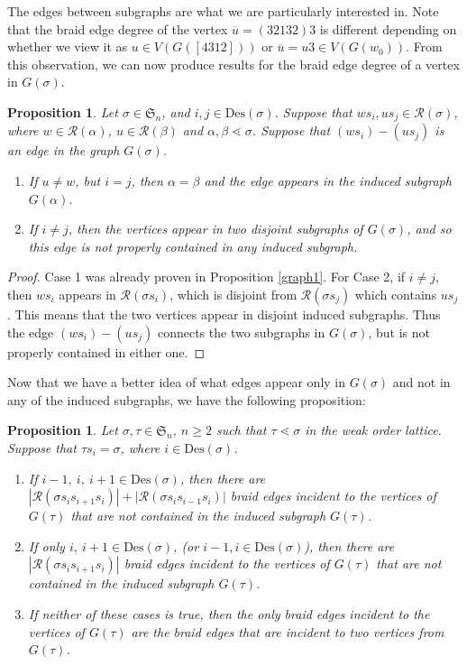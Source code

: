 \documentclass[11pt,reqno]{amsart}
\newtheorem{proposition}[theorem]{Proposition}
\theoremstyle{definition}
\theoremstyle{notation}
\newcommand{\Des}{\text{Des}}
\newcommand{\calR}{\mathcal{R}}
\begin{document}
The edges between subgraphs are what we are particularly interested in. Note that the braid edge degree of the vertex $\overline{u} = (32132)3$ is different depending on whether we view it as $u\in V(G([4312]))$ or $\overline{u} = u3\in V(G(w_0))$. From this observation, we can now produce results for the braid edge degree of a vertex in $G(\sigma)$.

\begin{proposition}\label{newEDGE}
Let $\sigma \in \mathfrak{S}_n$, and $i,j\in \Des(\sigma)$. Suppose that $ws_i, us_j \in \calR(\sigma)$, where $w\in \calR(\alpha)$, $u\in \calR(\beta)$ and $\alpha, \beta \lessdot \sigma$. Suppose that $(ws_i)- (us_j)$ is an edge in the graph $G(\sigma)$. 
\begin{enumerate}
\item If $u\neq w$, but $i=j$, then $\alpha = \beta$ and the edge appears in the induced subgraph $G(\alpha)$. 
\item If $i\neq j$, then the vertices appear in two disjoint subgraphs of $G(\sigma)$, and so this edge is not properly contained in any induced subgraph.
\end{enumerate}
\end{proposition}

\begin{proof}
Case 1 was already proven in Proposition \ref{graph1}. 
For Case 2, if $i\neq j$, then $ws_i$ appears in $\calR(\sigma s_i)$, which is disjoint from $\calR(\sigma s_j)$ which contains $us_j$. This means that the two vertices appear in disjoint induced subgraphs. Thus the edge $(ws_i)- (us_j)$ connects the two subgraphs in $G(\sigma)$, but is not properly contained in either one. 
\end{proof}


Now that we have a better idea of what edges appear only in $G(\sigma)$ and not in any of the induced subgraphs, we have the following proposition:

\begin{proposition}\label{braidrec11}
Let $\sigma, \tau \in \mathfrak{S}_n$, $n\geq 2$ such that $\tau \lessdot \sigma $ in the weak order lattice. Suppose that $\tau s_i = \sigma$, where $i\in \Des(\sigma)$.
\begin{enumerate}
\item If $i-1,~i,~i+1\in \Des(\sigma)$, then there are $|\calR(\sigma s_is_{i+1}s_i)|+|\calR(\sigma s_is_{i-1}s_i)|$ braid edges incident to the vertices of $G(\tau)$ that are not contained in the induced subgraph $G(\tau)$. 
\item If only $i,~i+1\in \Des(\sigma)$, (or $i-1,i\in \Des(\sigma)$), then there are $|\calR(\sigma s_is_{i+1}s_i)|$ braid edges incident to the vertices of $G(\tau)$ that are not contained in the induced subgraph $G(\tau)$. 
\item If neither of these cases is true, then the only braid edges incident to the vertices of $G(\tau)$ are the braid edges that are incident to two vertices from $G(\tau)$.  
\end{enumerate}
\end{proposition}
\end{document}
